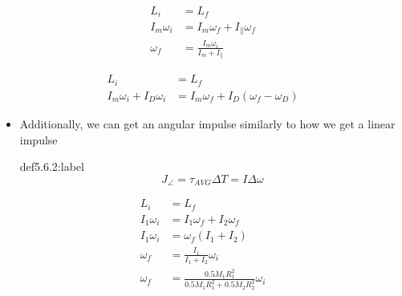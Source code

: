 \begin{problem}
    \[
    \begin{aligned}
        L_i &= L_f\\
        I_m\omega_i &= I_m\omega_f + I_\parallel\omega_f\\
        \omega_f &= \frac{I_m\omega_i}{I_m + I_\parallel}
    \end{aligned}    
    \]
\end{problem}


\begin{problem}
    \[
    \begin{aligned}
        L_i &= L_f\\
        I_m\omega_i + I_D\omega_i &= I_m\omega_f + I_D(\omega_f - \omega_D)
    \end{aligned}    
    \]
\end{problem}

\begin{itemize}
    \item Additionally, we can get an angular impulse similarly to how we get a linear impulse
    
    \begin{definition}{def5.6.2:label}
        \[
        J_\angle = \tau_{AVG}\Delta T = I \Delta \omega      
        \]
    \end{definition}
\end{itemize}


\begin{problem}
    \[
    \begin{aligned}
        L_i &= L_f\\
        I_1\omega_i &= I_1\omega_f + I_2\omega_f\\
        I_1\omega_i &= \omega_f(I_1 + I_2)\\
        \omega_f &= \frac{I_1}{I_1+I_2}\omega_i\\
        \omega_f &= \frac{0.5M_1R_1^2}{0.5M_1R_1^2+0.5M_2R_2^2}\omega_i\\
    \end{aligned}    
    \]
\end{problem}